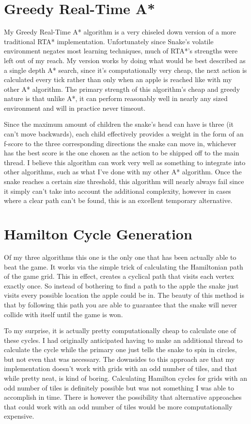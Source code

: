 \documentclass[letterpaper]{article} %
\begin{document}
\section{Greedy Real-Time A*}
 My Greedy Real-Time A* algorithm is a very chiseled down version of a more traditional RTA* implementation. Unfortunately since Snake's volatile environment negates most learning techniques, much of RTA*'s strengths were left out of my reach. My version works by doing what would be best described as a single depth A* search, since it's computationally very cheap, the next action is calculated every tick rather than only when an apple is reached like with my other A* algorithm. The primary strength of this algorithm's cheap and greedy nature is that unlike A*, it can perform reasonably well in nearly any sized environment and will in practice never timeout.

 Since the maximum amount of children the snake's head can have is three (it can't move backwards), each child effectively provides a weight in the form of an f-score to the three corresponding directions the snake can move in, whichever has the best score is the one chosen as the action to be shipped off to the main thread. I believe this algorithm can work very well as something to integrate into other algorithms, such as what I've done with my other A* algorithm. Once the snake reaches a certain size threshold, this algorithm will nearly always fail since it simply can't take into account the additional complexity, however in cases where a clear path can't be found, this is an excellent temporary alternative.

\section{Hamilton Cycle Generation}
Of my three algorithms this one is the only one that has been actually able to beat the game. It works via the simple trick of calculating the Hamiltonian path of the game grid. This in effect, creates a cyclical path that visits each vertex exactly once. So instead of bothering to find a path to the apple the snake just visits every possible location the apple could be in. The beauty of this method is that by following this path you are able to guarantee that the snake will never collide with itself until the game is won.

To my surprise, it is actually pretty computationally cheap to calculate one of these cycles. I had originally anticipated having to make an additional thread to calculate the cycle while the primary one just tells the snake to spin in circles, but not even that was necessary. The downsides to this approach are that my implementation doesn't work with grids with an odd number of tiles, and that while pretty neat, is kind of boring. Calculating Hamilton cycles for grids with an odd number of tiles is definitely possible but was not something I was able to accomplish in time. There is however the possibility that alternative approaches that could work with an odd number of tiles would be more computationally expensive.
\end{document}
